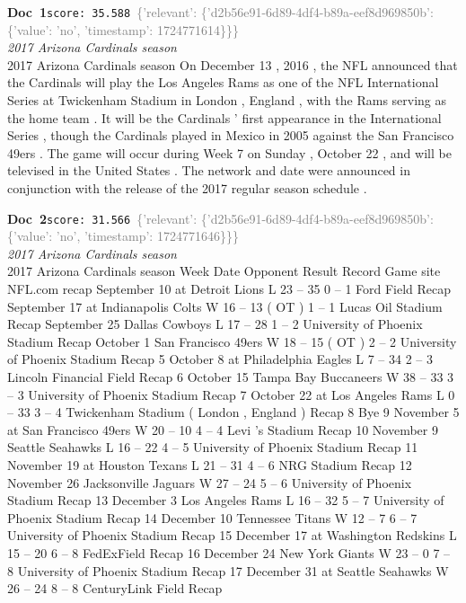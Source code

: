 \documentclass[a4paper,11pt]{article}
\begin{document}
\begin{docenv}
{\footnotesize\textcolor{doccolor}{\textbf{Doc~1}}}\hfill{\tiny\texttt{score:~35.588}}\ {\tiny\textcolor{gray}{\{'relevant': \{'d2b56e91-6d89-4df4-b89a-eef8d969850b': \{'value': 'no', 'timestamp': 1724771614\}\}\}}}\\[3pt]
{\small\textit{2017 Arizona Cardinals season}}\\[2pt]
\vspace{2pt}
{\footnotesize 2017 Arizona Cardinals season
On December 13 , 2016 , the NFL announced that the Cardinals will play the Los Angeles Rams as one of the NFL International Series at Twickenham Stadium in London , England , with the Rams serving as the home team . It will be the Cardinals ' first appearance in the International Series , though the Cardinals played in Mexico in 2005 against the San Francisco 49ers . The game will occur during Week 7 on Sunday , October 22 , and will be televised in the United States . The network and date were announced in conjunction with the release of the 2017 regular season schedule .}
\end{docenv}
\begin{docenv}
{\footnotesize\textcolor{doccolor}{\textbf{Doc~2}}}\hfill{\tiny\texttt{score:~31.566}}\ {\tiny\textcolor{gray}{\{'relevant': \{'d2b56e91-6d89-4df4-b89a-eef8d969850b': \{'value': 'no', 'timestamp': 1724771646\}\}\}}}\\[3pt]
{\small\textit{2017 Arizona Cardinals season}}\\[2pt]
\vspace{2pt}
{\footnotesize 2017 Arizona Cardinals season
Week Date Opponent Result Record Game site NFL.com recap September 10 at Detroit Lions L 23 -- 35 0 -- 1 Ford Field Recap September 17 at Indianapolis Colts W 16 -- 13 ( OT ) 1 -- 1 Lucas Oil Stadium Recap September 25 Dallas Cowboys L 17 -- 28 1 -- 2 University of Phoenix Stadium Recap October 1 San Francisco 49ers W 18 -- 15 ( OT ) 2 -- 2 University of Phoenix Stadium Recap 5 October 8 at Philadelphia Eagles L 7 -- 34 2 -- 3 Lincoln Financial Field Recap 6 October 15 Tampa Bay Buccaneers W 38 -- 33 3 -- 3 University of Phoenix Stadium Recap 7 October 22 at Los Angeles Rams L 0 -- 33 3 -- 4 Twickenham Stadium ( London , England ) Recap 8 Bye 9 November 5 at San Francisco 49ers W 20 -- 10 4 -- 4 Levi 's Stadium Recap 10 November 9 Seattle Seahawks L 16 -- 22 4 -- 5 University of Phoenix Stadium Recap 11 November 19 at Houston Texans L 21 -- 31 4 -- 6 NRG Stadium Recap 12 November 26 Jacksonville Jaguars W 27 -- 24 5 -- 6 University of Phoenix Stadium Recap 13 December 3 Los Angeles Rams L 16 -- 32 5 -- 7 University of Phoenix Stadium Recap 14 December 10 Tennessee Titans W 12 -- 7 6 -- 7 University of Phoenix Stadium Recap 15 December 17 at Washington Redskins L 15 -- 20 6 -- 8 FedExField Recap 16 December 24 New York Giants W 23 -- 0 7 -- 8 University of Phoenix Stadium Recap 17 December 31 at Seattle Seahawks W 26 -- 24 8 -- 8 CenturyLink Field Recap}
\end{docenv}
\end{document}

